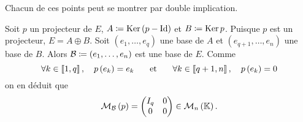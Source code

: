 \documentclass{magnolia}
\begin{document}
\begin{remarques}
\begin{enumerate}
  \end{enumerate}
  \begin{sol}
  Chacun de ces points peut se montrer par double implication.
  \end{sol}
\remarque Soit $p$ un projecteur de $E$, $A\coloneqq\mathop{\rm Ker}\left(p-\operatorname{Id}\right)$ et $B\coloneqq\mathop{\rm Ker} p$.
  Puisque $p$ est un projecteur, $E=A\oplus B$. Soit $(e_1,\ldots,e_q)$ une base
  de $A$ et $(e_{q+1},\ldots,e_n)$ une base de $B$. Alors
  $\mathcal{B}\coloneqq(e_1,\ldots,e_n)$ est une base de $E$. Comme
  \[\forall k\in\left\llbracket 1,q\right\rrbracket ,\quad p\left(e_k\right)=e_k \quad\quad\!\text{et}\quad\!\quad
    \forall k\in\left\llbracket q+1,n\right\rrbracket ,\quad p\left(e_k\right)=0\]
  on en déduit que
  \[\mathcal{M}_{\mathcal{B}}\left(p\right)=
    \begin{pmatrix}
    I_q & 0\\
    0 & 0
    \end{pmatrix}\in\mathcal{M}_{n}\left(\mathbb{K}\right).\]
\end{remarques}
\end{document}

